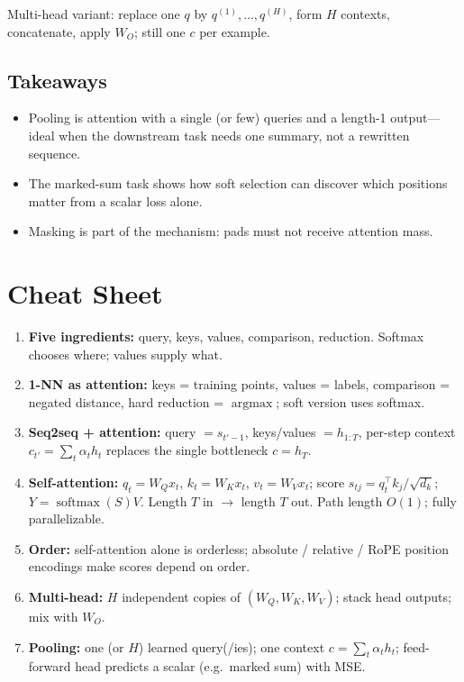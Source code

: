 \documentclass[11pt]{article}
\begin{document}
Multi-head variant: replace one \(q\) by \(q^{(1)},\ldots,q^{(H)}\), form
\(H\) contexts, concatenate, apply \(W_O\); still one \(c\) per example.

\subsection{Takeaways}

\begin{itemize}[leftmargin=*]
  \item Pooling is attention with a single (or few) queries and a
        length-1 output---ideal when the downstream task needs one
        summary, not a rewritten sequence.
  \item The marked-sum task shows how soft selection can discover
        which positions matter from a scalar loss alone.
  \item Masking is part of the mechanism: pads must not receive attention
        mass.
\end{itemize}

\section{Cheat Sheet}

\begin{enumerate}[leftmargin=*]
  \item \textbf{Five ingredients:} query, keys, values, comparison,
        reduction. Softmax chooses where; values supply what.
  \item \textbf{1-NN as attention:} keys = training points, values =
        labels, comparison = negated distance, hard reduction =
        \(\operatorname{argmax}\); soft version uses softmax.
  \item \textbf{Seq2seq + attention:} query \(=s_{t'-1}\), keys/values
        \(=h_{1:T}\), per-step context \(c_{t'}=\sum_t\alpha_t h_t\)
        replaces the single bottleneck \(c=h_T\).
  \item \textbf{Self-attention:} \(q_t=W_Q x_t\), \(k_t=W_K x_t\),
        \(v_t=W_V x_t\); score \(s_{tj}=q_t^\top k_j/\sqrt{d_k}\);
        \(Y=\operatorname{softmax}(S)V\). Length \(T\) in \(\to\) length
        \(T\) out. Path length \(O(1)\); fully parallelizable.
  \item \textbf{Order:} self-attention alone is orderless; absolute /
        relative / RoPE position encodings make scores depend on order.
  \item \textbf{Multi-head:} \(H\) independent copies of
        \((W_Q,W_K,W_V)\); stack head outputs; mix with \(W_O\).
  \item \textbf{Pooling:} one (or \(H\)) learned query(/ies); one context
        \(c=\sum_t\alpha_t h_t\); feed-forward head predicts a scalar
        (e.g.\ marked sum) with MSE.
\end{enumerate}
\end{document}
